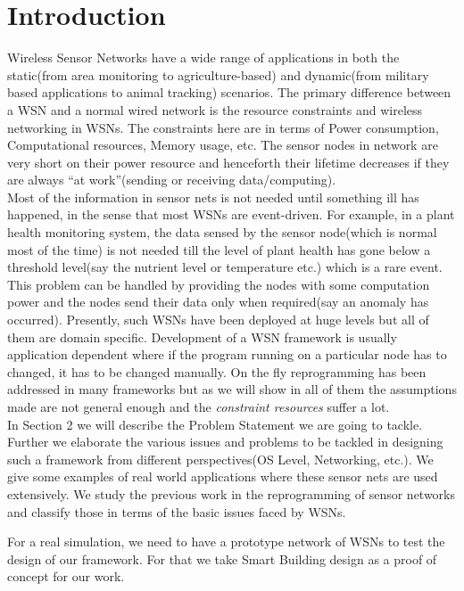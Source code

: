 \documentclass[twocolumn]{article}
\begin{document}
\section{Introduction}
Wireless Sensor Networks have a wide range of applications in both the static(from area monitoring to agriculture-based) and dynamic(from military based applications to animal tracking) scenarios. The primary difference between a WSN and a normal wired network is the resource constraints and wireless networking in WSNs. The constraints here are in terms of Power consumption, Computational resources, Memory usage, etc. The sensor nodes in network are very short on their power resource and henceforth their lifetime decreases if they are always ``at work''(sending or receiving data/computing).\\
Most of the information in sensor nets is not needed until something ill has happened, in the sense that most WSNs are event-driven. For example, in a plant health monitoring system, the data sensed by the sensor node(which is normal most of the time) is not needed till the level of plant health has gone below a threshold level(say the nutrient level or temperature etc.) which is a rare event. This problem can be handled by providing the nodes with some computation power and the nodes send their data only when required(say an anomaly has occurred).
Presently, such WSNs have been deployed at huge levels but all of them are domain specific. Development of a WSN framework is usually application dependent where if the program running on a particular node has to changed, it has to be changed manually. On the fly reprogramming has been addressed in many frameworks but as we will show in all of them the assumptions made are not general enough and the \emph{constraint resources} suffer a lot.\\
In Section 2 we will describe the Problem Statement we are going to tackle. Further we elaborate the various issues and problems to be tackled in designing such a framework from different perspectives(OS Level, Networking, etc.). We give some examples of real world applications where these sensor nets are used extensively. We study the previous work in the reprogramming of sensor networks and classify those in terms of the basic issues faced by WSNs.

For a real simulation, we need to have a prototype network of WSNs to test the design of our framework. For that we take Smart Building design as a proof of concept for our work.

\end{document}
